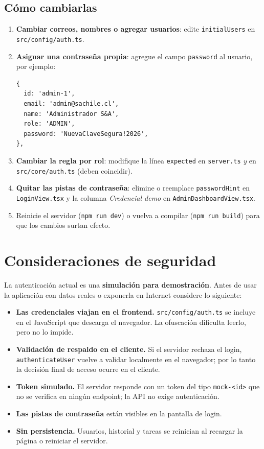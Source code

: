 \documentclass[11pt,a4paper]{article}
\newcommand{\ruta}[1]{\texttt{#1}}
\begin{document}
\subsection{Cómo cambiarlas}
\begin{enumerate}[leftmargin=*]
  \item \textbf{Cambiar correos, nombres o agregar usuarios}: edite \texttt{initialUsers}
        en \ruta{src/config/auth.ts}.
  \item \textbf{Asignar una contraseña propia}: agregue el campo \texttt{password} al
        usuario, por ejemplo:
\begin{lstlisting}
{
  id: 'admin-1',
  email: 'admin@sachile.cl',
  name: 'Administrador S&A',
  role: 'ADMIN',
  password: 'NuevaClaveSegura!2026',
},
\end{lstlisting}
  \item \textbf{Cambiar la regla por rol}: modifique la línea \texttt{expected} en
        \ruta{server.ts} \emph{y} en \ruta{src/core/auth.ts} (deben coincidir).
  \item \textbf{Quitar las pistas de contraseña}: elimine o reemplace
        \texttt{passwordHint} en \ruta{LoginView.tsx} y la columna \emph{Credencial demo}
        en \ruta{AdminDashboardView.tsx}.
  \item Reinicie el servidor (\texttt{npm run dev}) o vuelva a compilar
        (\texttt{npm run build}) para que los cambios surtan efecto.
\end{enumerate}

\section{Consideraciones de seguridad}\label{sec:seguridad}

La autenticación actual es una \textbf{simulación para demostración}. Antes de usar la
aplicación con datos reales o exponerla en Internet considere lo siguiente:

\begin{itemize}[leftmargin=*]
  \item \textbf{Las credenciales viajan en el frontend.} \ruta{src/config/auth.ts} se
        incluye en el JavaScript que descarga el navegador. La ofuscación dificulta
        leerlo, pero no lo impide.
  \item \textbf{Validación de respaldo en el cliente.} Si el servidor rechaza el login,
        \texttt{authenticateUser} vuelve a validar localmente en el navegador; por lo
        tanto la decisión final de acceso ocurre en el cliente.
  \item \textbf{Token simulado.} El servidor responde con un token del tipo
        \texttt{mock-<id>} que no se verifica en ningún endpoint; la API no exige
        autenticación.
  \item \textbf{Las pistas de contraseña} están visibles en la pantalla de login.
  \item \textbf{Sin persistencia.} Usuarios, historial y tareas se reinician al recargar
        la página o reiniciar el servidor.
\end{itemize}
\end{document}
